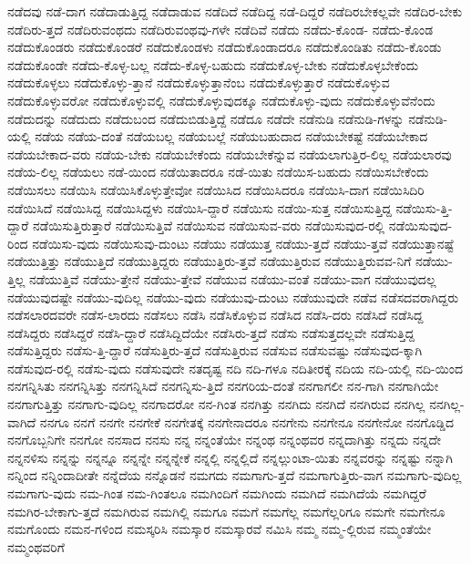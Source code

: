 {ನಡೆದವು
ನಡೆ-ದಾಗ
ನಡೆದಾಡುತ್ತಿದ್ದ
ನಡೆದಾಡುವ
ನಡೆದಿದೆ
ನಡೆದಿದ್ದ
ನಡೆ-ದಿದ್ದರೆ
ನಡೆದಿರಬೇಕಲ್ಲವೇ
ನಡೆದಿರ-ಬೇಕು
ನಡೆದಿರು-ತ್ತದೆ
ನಡೆದಿರುವಂಥದು
ನಡೆದಿರುವಂಥವು-ಗಳೇ
ನಡೆದಿವೆ
ನಡೆದು
ನಡೆದು-ಕೊಂಡ-
ನಡೆದು-ಕೊಂಡ
ನಡೆದುಕೊಂಡರು
ನಡೆದುಕೊಂಡರೆ
ನಡೆದುಕೊಂಡಳು
ನಡೆದುಕೊಂಡಾದರೂ
ನಡೆದುಕೊಂಡಿತು
ನಡೆದು-ಕೊಂಡು
ನಡೆದುಕೊಂಡೇ
ನಡೆದು-ಕೊಳ್ಳ-ಬಲ್ಲ
ನಡೆದು-ಕೊಳ್ಳ-ಬಹುದು
ನಡೆದುಕೊಳ್ಳ-ಬೇಕು
ನಡೆದುಕೊಳ್ಳಬೇಕೆಂದು
ನಡೆದುಕೊಳ್ಳಲು
ನಡೆದುಕೊಳ್ಳು-ತ್ತಾನೆ
ನಡೆದುಕೊಳ್ಳುತ್ತಾನೆಂಬ
ನಡೆದುಕೊಳ್ಳುತ್ತಾರೆ
ನಡೆದುಕೊಳ್ಳುವ
ನಡೆದುಕೊಳ್ಳುವರೋ
ನಡೆದುಕೊಳ್ಳುವಲ್ಲಿ
ನಡೆದುಕೊಳ್ಳುವುದಕ್ಕೂ
ನಡೆದುಕೊಳ್ಳು-ವುದು
ನಡೆದುಕೊಳ್ಳುವೆನೆಂದು
ನಡೆದುದನ್ನು
ನಡೆದುದು
ನಡೆದುಬಂದ
ನಡೆದುಬಿಡುತ್ತಿದ್ದೆ
ನಡೆದೂ
ನಡೆದೇ
ನಡೆನುಡಿ
ನಡೆನುಡಿ-ಗಳನ್ನು
ನಡೆನುಡಿ-ಯಲ್ಲಿ
ನಡೆಯ
ನಡೆಯ-ದಂತೆ
ನಡೆಯಬಲ್ಲ
ನಡೆಯಬಲ್ಲೆ
ನಡೆಯಬಹುದಾದ
ನಡೆಯಬೇಕಷ್ಟೆ
ನಡೆಯಬೇಕಾದ
ನಡೆಯಬೇಕಾದ-ವರು
ನಡೆಯ-ಬೇಕು
ನಡೆಯಬೇಕೆಂದು
ನಡೆಯಬೇಕೆನ್ನುವ
ನಡೆಯಲಾಗುತ್ತಿರ-ಲಿಲ್ಲ
ನಡೆಯಲಾರವು
ನಡೆಯ-ಲಿಲ್ಲ
ನಡೆಯಲು
ನಡೆ-ಯಿಂದ
ನಡೆಯಿತಾದರೂ
ನಡೆ-ಯಿತು
ನಡೆಯಿಸ-ಬಹುದು
ನಡೆಯಿಸಬೇಕೆಂದು
ನಡೆಯಿಸಲು
ನಡೆಯಿಸಿ
ನಡೆಯಿಸಿಕೊಳ್ಳುತ್ತೇವೋ
ನಡೆಯಿಸಿದ
ನಡೆಯಿಸಿದರೂ
ನಡೆಯಿಸಿ-ದಾಗ
ನಡೆಯಿಸಿದಿರಿ
ನಡೆಯಿಸಿದೆ
ನಡೆಯಿಸಿದ್ದ
ನಡೆಯಿಸಿದ್ದಳು
ನಡೆಯಿಸಿ-ದ್ದಾರೆ
ನಡೆಯಿಸು
ನಡೆಯಿ-ಸುತ್ತ
ನಡೆಯಿಸುತ್ತಿದ್ದ
ನಡೆಯಿಸು-ತ್ತಿ-ದ್ದಾರೆ
ನಡೆಯಿಸುತ್ತಿರುತ್ತಾರೆ
ನಡೆಯಿಸುತ್ತಿವೆ
ನಡೆಯಿಸುವ
ನಡೆಯಿಸುವ-ವರು
ನಡೆಯಿಸುವುದ-ರಲ್ಲಿ
ನಡೆಯಿಸುವುದ-ರಿಂದ
ನಡೆಯಿಸು-ವುದು
ನಡೆಯಿಸುವು-ದುಂಟು
ನಡೆಯು
ನಡೆಯುತ್ತ
ನಡೆಯು-ತ್ತದೆ
ನಡೆಯು-ತ್ತವೆ
ನಡೆಯುತ್ತಾನಷ್ಟೆ
ನಡೆಯುತ್ತಿತ್ತು
ನಡೆಯುತ್ತಿದೆ
ನಡೆಯುತ್ತಿದ್ದರು
ನಡೆಯುತ್ತಿರು-ತ್ತವೆ
ನಡೆಯುತ್ತಿರುವ
ನಡೆಯುತ್ತಿರುವವ-ನಿಗೆ
ನಡೆಯು-ತ್ತಿಲ್ಲ
ನಡೆಯುತ್ತಿವೆ
ನಡೆಯು-ತ್ತೇನೆ
ನಡೆಯು-ತ್ತೇವೆ
ನಡೆಯುವ
ನಡೆಯು-ವಂತೆ
ನಡೆಯು-ವಾಗ
ನಡೆಯುವುದಲ್ಲ
ನಡೆಯುವುದಷ್ಟೇ
ನಡೆಯು-ವುದಿಲ್ಲ
ನಡೆಯು-ವುದು
ನಡೆಯುವು-ದುಂಟು
ನಡೆಯುವುದೇ
ನಡೆವ
ನಡೆಸದವರಾಗಿದ್ದರು
ನಡೆಸಲಾರದವರೇ
ನಡೆಸ-ಲಾರದು
ನಡೆಸಲು
ನಡೆಸಿ
ನಡೆಸಿಕೊಳ್ಳುವ
ನಡೆಸಿದ
ನಡೆಸಿ-ದರು
ನಡೆಸಿದೆ
ನಡೆಸಿದ್ದ
ನಡೆಸಿದ್ದರು
ನಡೆಸಿದ್ದರೆ
ನಡೆಸಿ-ದ್ದಾರೆ
ನಡೆಸಿದ್ದಿದೆಯೇ
ನಡೆಸಿರು-ತ್ತದೆ
ನಡೆಸು
ನಡೆಸುತ್ತದಲ್ಲವೇ
ನಡೆಸುತ್ತಿದ್ದ
ನಡೆಸುತ್ತಿದ್ದರು
ನಡೆಸು-ತ್ತಿ-ದ್ದಾರೆ
ನಡೆಸುತ್ತಿರು-ತ್ತದೆ
ನಡೆಸುತ್ತಿರುವ
ನಡೆಸುವ
ನಡೆಸುವಷ್ಟು
ನಡೆಸುವುದ-ಕ್ಕಾಗಿ
ನಡೆಸುವುದ-ರಲ್ಲಿ
ನಡೆಸು-ವುದು
ನಡೆಸುವುದೇ
ನತದೃಷ್ಟ
ನದಿ
ನದಿ-ಗಳೂ
ನದಿತೀರಕ್ಕೆ
ನದಿಯ
ನದಿ-ಯಲ್ಲಿ
ನದಿ-ಯಿಂದ
ನನಗನ್ನಿಸಿತು
ನನಗನ್ನಿಸಿತ್ತು
ನನಗನ್ನಿಸಿದೆ
ನನಗನ್ನಿಸು-ತ್ತಿದೆ
ನನಗರಿಯ-ದಂತೆ
ನನಗಾಗಲೀ
ನನ-ಗಾಗಿ
ನನಗಾಗಿಯೇ
ನನಗಾಗುತ್ತಿತ್ತು
ನನಗಾಗು-ವುದಿಲ್ಲ
ನನಗಾದರೋ
ನನ-ಗಿಂತ
ನನಗಿತ್ತು
ನನಗಿದು
ನನಗಿದೆ
ನನಗಿರುವ
ನನಗಿಲ್ಲ
ನನಗಿಲ್ಲ-ವಾಗಿದೆ
ನನಗೂ
ನನಗೆ
ನನಗೇ
ನನಗೇಕೆ
ನನಗೇತಕ್ಕೆ
ನನಗೇನಾದರೂ
ನನಗೇನು
ನನಗೇನೂ
ನನಗೇನೋ
ನನಗೊಡ್ಡಿದ
ನನಗೊಬ್ಬನಿಗೇ
ನನಗೋ
ನನಸಾದ
ನನಸು
ನನ್ನ
ನನ್ನಂತೆಯೇ
ನನ್ನಂಥ
ನನ್ನಂಥವರ
ನನ್ನದಾಗಿತ್ತು
ನನ್ನದು
ನನ್ನದೇ
ನನ್ನನಳಿಸು
ನನ್ನನ್ನು
ನನ್ನನ್ನೂ
ನನ್ನನ್ನೇ
ನನ್ನನ್ನೇಕೆ
ನನ್ನಲ್ಲಿ
ನನ್ನಲ್ಲಿದೆ
ನನ್ನಲ್ಲುಂಟಾ-ಯಿತು
ನನ್ನವರನ್ನು
ನನ್ನಷ್ಟು
ನನ್ನಾಗಿ
ನನ್ನಿಂದ
ನನ್ನಿಂದಾದೀತೇ
ನನ್ನೆದೆಯ
ನನ್ನೊಡನೆ
ನಮಗದು
ನಮಗಾಗು-ತ್ತದೆ
ನಮಗಾಗುತ್ತಿರು-ವಾಗ
ನಮಗಾಗು-ವುದಿಲ್ಲ
ನಮಗಾಗು-ವುದು
ನಮ-ಗಿಂತ
ನಮ-ಗಿಂತಲೂ
ನಮಗಿಂದಿಗೆ
ನಮಗಿಂದು
ನಮಗಿದೆ
ನಮಗಿದೆಯೆ
ನಮಗಿದ್ದರೆ
ನಮಗಿರ-ಬೇಕಾಗು-ತ್ತದೆ
ನಮಗಿರುವ
ನಮಗಿಲ್ಲಿ
ನಮಗೂ
ನಮಗೆ
ನಮಗೆಲ್ಲ
ನಮಗೆಲ್ಲರಿಗೂ
ನಮಗೇ
ನಮಗೇನೂ
ನಮಗೊಂದು
ನಮನ-ಗಳಿಂದ
ನಮಸ್ಕರಿಸಿ
ನಮಸ್ಕಾರ
ನಮಸ್ಕಾರವೆ
ನಮಿಸಿ
ನಮ್ಮ
ನಮ್ಮ-ಲ್ಲಿರುವ
ನಮ್ಮಂತೆಯೇ
ನಮ್ಮಂಥವರಿಗೆ
}
